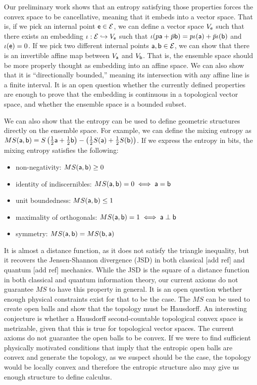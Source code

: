 Our preliminary work shows that an entropy satisfying those properties forces the convex space to be cancellative, meaning that it embeds into a vector space. That is, if we pick an internal point $\ens \in \Ens$, we can define a vector space $V_{\ens}$ such that there exists an embedding $\iota : \Ens \hookrightarrow  V_{\ens}$ such that $\iota(p \ens[a] + \bar{p} \ens[b]) = p \iota(\ens[a]) + \bar{p} \iota(\ens[b])$ and $\iota(\ens) = 0$. If we pick two different internal points $\ens[a],\ens[b] \in \Ens$, we can show that there is an invertible affine map between $V_{\ens[a]}$ and $V_{\ens[b]}$. That is, the ensemble space should be more properly thought as embedding into an affine space. We can also show that it is ``directionally bounded,'' meaning its intersection with any affine line is a finite interval. It is an open question whether the currently defined properties are enough to prove that the embedding is continuous in a topological vector space, and whether the ensemble space is a bounded subset.

We can also show that the entropy can be used to define geometric structures directly on the ensemble space. For example, we can define the mixing entropy as $MS(\ens[a], \ens[b]) = S\left(\frac{1}{2}\ens[a] + \frac{1}{2} \ens[b]\right) - \left(\frac{1}{2} S(\ens[a]) + \frac{1}{2} S(\ens[b])\right)$. If we express the entropy in bits, the mixing entropy satisfies the following:
\begin{itemize}
	\item non-negativity: $MS(\ens[a], \ens[b]) \geq 0$
	\item identity of indiscernibles: $MS(\ens[a], \ens[b]) = 0 \iff \ens[a]=\ens[b]$
	\item unit boundedness: $MS(\ens[a], \ens[b]) \leq 1$
	\item maximality of orthogonals: $MS(\ens[a], \ens[b]) = 1 \iff \ens[a] \ortho \ens[b]$
	\item symmetry: $MS(\ens[a], \ens[b]) = MS(\ens[b], \ens[a])$
\end{itemize}
It is almost a distance function, as it does not satisfy the triangle inequality, but it recovers the Jensen-Shannon divergence (JSD) in both classical [add ref] and quantum [add ref] mechanics. While the JSD is the square of a distance function in both classical and quantum information theory, our current axioms do not guarantee $MS$ to have this property in general. It is an open question whether enough physical constraints exist for that to be the case. The $MS$ can be used to create open balls and show that the topology must be Hausdorff. An interesting conjecture is whether a Hausdorff second-countable topological convex space is metrizable, given that this is true for topological vector spaces. The current axioms do not guarantee the open balls to be convex. If we were to find sufficient physically motivated conditions that imply that the entropic open balls are convex and generate the topology, as we suspect should be the case, the topology would be locally convex and therefore the entropic structure also may give us enough structure to define calculus.

